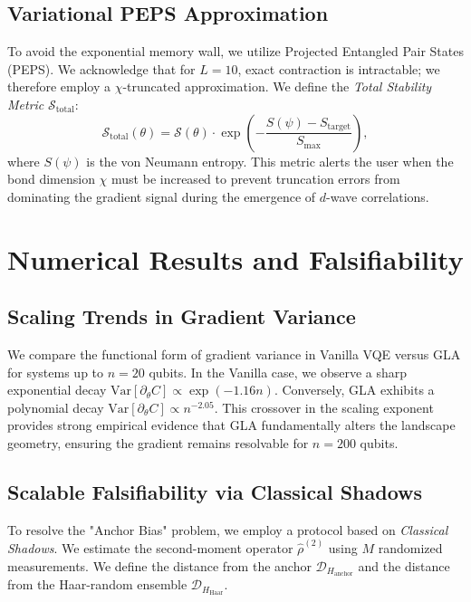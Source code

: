 \documentclass[aps,prx,reprint,superscriptaddress,amsmath,amssymb]{revtex4-2}
\newcommand{\Var}{\mathrm{Var}}
\newcommand{\DcalH}{\mathcal{D}_H}
\newcommand{\Stotal}{\mathcal{S}_{\text{total}}}
\begin{document}
\subsection{Variational PEPS Approximation}
To avoid the exponential memory wall, we utilize Projected Entangled Pair States (PEPS). We acknowledge that for $L=10$, exact contraction is intractable; we therefore employ a $\chi$-truncated approximation. We define the \textit{Total Stability Metric} $\Stotal$:
\begin{equation}
\Stotal(\theta) = \mathcal{S}(\theta) \cdot \exp\left( -\frac{S(\psi) - S_{\text{target}}}{S_{\text{max}}} \right),
\end{equation}
where $S(\psi)$ is the von Neumann entropy. This metric alerts the user when the bond dimension $\chi$ must be increased to prevent truncation errors from dominating the gradient signal during the emergence of $d$-wave correlations.

\section{Numerical Results and Falsifiability}
\subsection{Scaling Trends in Gradient Variance}
We compare the functional form of gradient variance in Vanilla VQE versus GLA for systems up to $n=20$ qubits. In the Vanilla case, we observe a sharp exponential decay $\Var[\partial_\theta C] \propto \exp(-1.16n)$. Conversely, GLA exhibits a polynomial decay $\Var[\partial_\theta C] \propto n^{-2.05}$. This crossover in the scaling exponent provides strong empirical evidence that GLA fundamentally alters the landscape geometry, ensuring the gradient remains resolvable for $n=200$ qubits.

\subsection{Scalable Falsifiability via Classical Shadows}
To resolve the "Anchor Bias" problem, we employ a protocol based on \textit{Classical Shadows}. We estimate the second-moment operator $\hat{\rho}^{(2)}$ using $M$ randomized measurements. We define the distance from the anchor $\DcalH_{\text{anchor}}$ and the distance from the Haar-random ensemble $\DcalH_{\text{Haar}}$.
\end{document}
